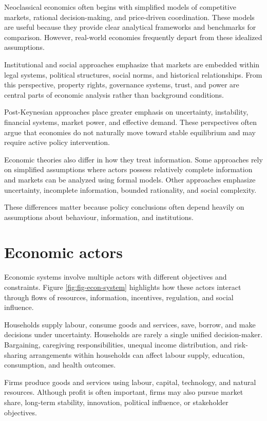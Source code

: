 \documentclass[
  11pt,
  oneside]{book}
\begin{document}
Neoclassical economics often begins with simplified models of competitive markets, rational decision-making, and price-driven coordination. These models are useful because they provide clear analytical frameworks and benchmarks for comparison. However, real-world economies frequently depart from these idealized assumptions.

Institutional and social approaches emphasize that markets are embedded within legal systems, political structures, social norms, and historical relationships. From this perspective, property rights, governance systems, trust, and power are central parts of economic analysis rather than background conditions.

Post-Keynesian approaches place greater emphasis on uncertainty, instability, financial systems, market power, and effective demand. These perspectives often argue that economies do not naturally move toward stable equilibrium and may require active policy intervention.

Economic theories also differ in how they treat information. Some approaches rely on simplified assumptions where actors possess relatively complete information and markets can be analyzed using formal models. Other approaches emphasize uncertainty, incomplete information, bounded rationality, and social complexity.

These differences matter because policy conclusions often depend heavily on assumptions about behaviour, information, and institutions.

\section{Economic actors}\label{economic-actors}

Economic systems involve multiple actors with different objectives and constraints. Figure \ref{fig:fig-econ-system} highlights how these actors interact through flows of resources, information, incentives, regulation, and social influence.

Households supply labour, consume goods and services, save, borrow, and make decisions under uncertainty. Households are rarely a single unified decision-maker. Bargaining, caregiving responsibilities, unequal income distribution, and risk-sharing arrangements within households can affect labour supply, education, consumption, and health outcomes.

Firms produce goods and services using labour, capital, technology, and natural resources. Although profit is often important, firms may also pursue market share, long-term stability, innovation, political influence, or stakeholder objectives.
\end{document}
